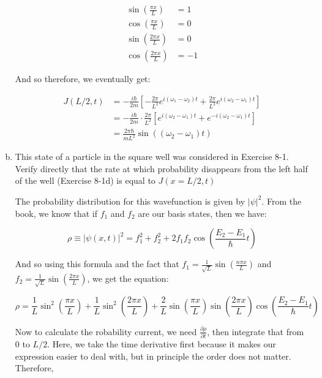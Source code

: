 \documentclass[10pt]{article}
\begin{document}
\begin{enumerate}[(a)]
\begin{solution}
            \begin{align*}
                \sin \left( \frac{\pi x}{L}\right) &= 1\\
                \cos \left( \frac{\pi x}{L}\right) &= 0\\
                \sin \left( \frac{2\pi x}{L}\right) &= 0\\
                \cos \left( \frac{2\pi x}{L}\right) &= -1
            \end{align*}

            And so therefore, we eventually get: 

            \begin{align*}
                J(L/2, t) &= -\frac{i\hbar}{2m} \left[ -\frac{2\pi}{L^2} e^{i(\omega_1 - \omega_2)t} + \frac{2\pi}{L^2} e^{i(\omega_2 - \omega_1)t}\right]\\
                &= -\frac{i\hbar}{2m} \cdot \frac{2\pi}{L^2}\left[ e^{i(\omega_2 - \omega_1)t} + e^{-i(\omega_2 - \omega_1)t}\right]\\
                &= \frac{2\pi \hbar}{mL^2} \sin((\omega_2 - \omega_1)t)
            \end{align*}
        \end{solution}
        \item This state of a particle in the square well was considered in Exercise 8-1. Verify directly that the rate at which probability disappears from the left half of the well (Exercise 8-1d) is equal to $J(x = L/2, t)$
        
        \begin{solution}
            The probability distribution for this wavefunction is given by $|\psi|^2$. From the book, we know that if $f_1$ and $f_2$ are our basis states, then we have:

            \[ \rho \equiv |\psi(x, t)|^2 = f_1^2 + f_2^2 + 2 f_1f_2 \cos\left( \frac{E_2 - E_1}{\hbar} t\right)\] 

            And so using this formula and the fact that $f_1 = \frac{1}{\sqrt{L}} \sin\left( \frac{n\pi x}{L}\right)$ and $f_2 = \frac{1}{\sqrt L} \sin\left( \frac{2\pi x}{L}\right)$, we get the equation: 

            \[ \rho = \frac{1}{L} \sin^2\left( \frac{\pi x}{L}\right) + \frac{1}{L} \sin^2 \left( \frac{2\pi x}{L}\right) + \frac{2}{L}\sin \left( \frac{ \pi x}{L}\right) \sin \left( \frac{2\pi x}{L}\right) \cos\left( \frac{E_2 - E_1}{\hbar}t\right)\] 

            Now to calculate the robability current, we need $\frac{\partial \rho}{\partial t}$, then integrate that from 0 to $L/2$. Here, we take the time derivative first because it makes our expression easier to deal with, but in principle the order does not matter. Therefore, 


\end{solution}
\end{enumerate}
\end{document}
